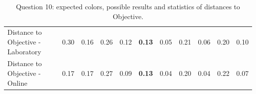 \begin{table}[htbp]
{\begin{tabular}{lccccccccccccc}
    \multicolumn{4}{l}{Distance to Objective - Laboratory}                                                                                           & \multicolumn{1}{|c}{0.30}       & \multicolumn{1}{c|}{0.16}    & \multicolumn{1}{|c}{0.26}       & \multicolumn{1}{c|}{0.12}    & \multicolumn{1}{|c}{\textbf{0.13}}       & \multicolumn{1}{c|}{0.05}    & \multicolumn{1}{|c}{0.21}       & \multicolumn{1}{c|}{0.06}    & \multicolumn{1}{|c}{0.20}       & \multicolumn{1}{c|}{0.10}    \\
    \multicolumn{4}{l}{Distance to Objective - Online}                                                                                               & \multicolumn{1}{|c}{0.17}        & \multicolumn{1}{c|}{0.17}    & \multicolumn{1}{|c}{0.27}        & \multicolumn{1}{c|}{0.09}    & \multicolumn{1}{|c}{\textbf{0.13}}       & \multicolumn{1}{c|}{0.04}    & \multicolumn{1}{|c}{0.20}        & \multicolumn{1}{c|}{0.04}    & \multicolumn{1}{|c}{0.22}       & \multicolumn{1}{c|}{0.07}    \\ \hline
    \end{tabular}}
  \caption[Question 10, with expected Results.]{Question 10: expected colors, possible results and statistics of distances to Objective.}
  \label{table:lab_q10_expected}
\end{table}
%

